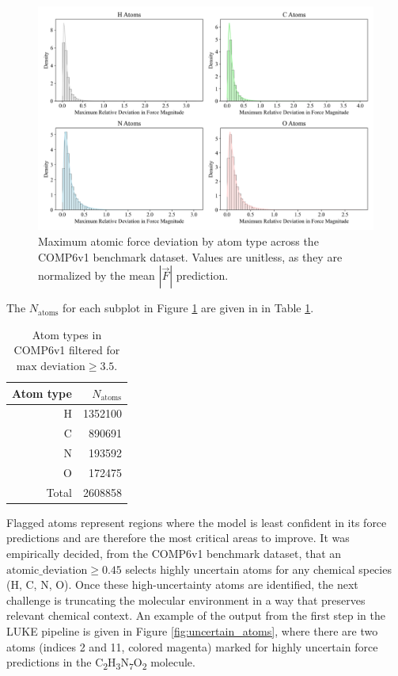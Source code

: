 \begin{figure}[!hb]
    \centering
    \includegraphics[width=0.9\linewidth]{Images/2xr_forces/max_force_deviation_by_species_subplots.png}
    \caption[Maximum atomic force deviation by atom type (COMP6v1)]{Maximum atomic force deviation by atom type across the COMP6v1 benchmark dataset. Values are unitless, as they are normalized by the mean $|\vec{F}|$ prediction.}
    \label{fig:atomic_deviations}
\end{figure}

The $N_\text{atoms}$ for each subplot in Figure \ref{fig:atomic_deviations} are given in in Table \ref{tbl:filtered_comp6v1_atom_count}.

\begin{table}[h!]
\centering
\caption[Atom counts in filtered COMP6v1]{
Atom types in COMP6v1 filtered for $\text{max deviation} \geq 3.5.$
}\label{tbl:filtered_comp6v1_atom_count}
\begin{tabularx}{0.25\textwidth}{rr}  
\toprule
Atom type & $N_\text{atoms}$ \\
\midrule
H & 1352100 \\
C & 890691 \\ 
N & 193592 \\ 
O & 172475 \\ 
Total & 2608858 \\
\bottomrule
\end{tabularx}
\end{table}


Flagged atoms represent regions where the model is least confident in its force predictions and are therefore the most critical areas to improve.
It was empirically decided, from the COMP6v1 benchmark dataset, that an $\text{atomic\_deviation} \geq 0.45$ selects highly uncertain atoms for any chemical species (H, C, N, O).
Once these high-uncertainty atoms are identified, the next challenge is truncating the molecular environment in a way that preserves relevant chemical context. 
An example of the output from the first step in the LUKE pipeline is given in Figure \ref{fig:uncertain_atoms}, where there are two atoms (indices 2 and 11, colored magenta) marked for highly uncertain force predictions in the C\textsubscript{2}H\textsubscript{3}N\textsubscript{7}O\textsubscript{2} molecule.

